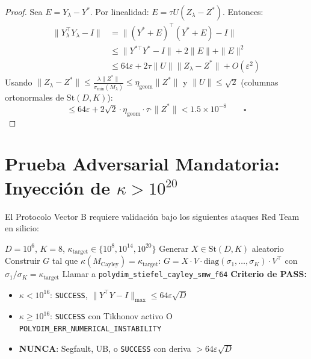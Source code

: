 \begin{proof}
Sea $E = Y_\lambda - Y^*$. Por linealidad: $E = \tau U (Z_\lambda - Z^*)$.
Entonces:
\begin{align}
  \|Y_\lambda^\top Y_\lambda - I\| &= \|(Y^* + E)^\top(Y^* + E) - I\| \\
  &\le \|Y^{*\top}Y^* - I\| + 2\|E\| + \|E\|^2 \\
  &\le 64\varepsilon + 2\tau\|U\|\|Z_\lambda - Z^*\| + O(\varepsilon^2)
\end{align}
Usando $\|Z_\lambda - Z^*\| \le \frac{\lambda \|Z^*\|}{\sigma_{\min}(M_\lambda)} \le \eta_{\text{geom}} \|Z^*\|$
y $\|U\| \le \sqrt{2}$ (columnas ortonormales de $\mathrm{St}(D,K)$):
\begin{equation}
  \le 64\varepsilon + 2\sqrt{2} \cdot \eta_{\text{geom}} \cdot \tau \cdot \|Z^*\| < 1.5 \times 10^{-8} \qquad \square
\end{equation}
\end{proof}

\section{Prueba Adversarial Mandatoria: Inyección de $\kappa > 10^{20}$}

El Protocolo Vector B requiere validación bajo los siguientes ataques Red Team en silicio:

\begin{algorithm}

\begin{algorithmic}[1]
\Require $D = 10^6$, $K = 8$, $\kappa_{\text{target}} \in \{10^8, 10^{14}, 10^{20}\}$
\State Generar $X \in \mathrm{St}(D,K)$ aleatorio
\State Construir $G$ tal que $\kappa(M_{\text{Cayley}}) = \kappa_{\text{target}}$:
  $G = X \cdot V \cdot \text{diag}(\sigma_1, \ldots, \sigma_K) \cdot V^\top$
  con $\sigma_1/\sigma_K = \kappa_{\text{target}}$
\State Llamar a \texttt{polydim\_stiefel\_cayley\_smw\_f64}
\State \textbf{Criterio de PASS:}
  \begin{itemize}
    \item $\kappa < 10^{16}$: \texttt{SUCCESS}, $\|Y^\top Y - I\|_{\max} \le 64\varepsilon\sqrt{D}$
    \item $\kappa \ge 10^{16}$: \texttt{SUCCESS} con Tikhonov activo O \texttt{POLYDIM\_ERR\_NUMERICAL\_INSTABILITY}
    \item \textbf{NUNCA}: Segfault, UB, o \texttt{SUCCESS} con deriva $> 64\varepsilon\sqrt{D}$
  \end{itemize}
\end{algorithmic}
\end{algorithm}


